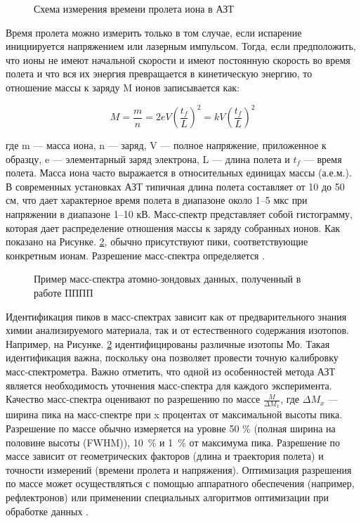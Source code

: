 \begin{figure}[ht]
	\caption{Схема измерения времени пролета иона в АЗТ}
	\label{fig:time_flight}
\end{figure} 

Время пролета можно измерить только в том случае, если испарение инициируется напряжением или лазерным импульсом. Тогда, если предположить, что ионы не имеют начальной скорости и имеют постоянную скорость во время полета и что вся их энергия превращается в кинетическую энергию, то отношение массы к заряду M ионов записывается как:

\begin{equation}
	\label{eq:equation8}
	M = \frac{m}{n} = 2eV(\frac{t_f}{L})^2 = kV(\frac{t_f}{L})^2
\end{equation}

где m — масса иона, n — заряд, V — полное напряжение, приложенное к образцу, e — элементарный заряд электрона, L — длина полета и $t_f$ — время полета. Масса иона часто выражается в относительных единицах массы (а.е.м.). В современных установках АЗТ типичная длина полета составляет от 10 до 50 см, что дает характерное время полета в диапазоне около 1–5 мкс при напряжении в диапазоне 1–10 кВ.
Масс-спектр представляет собой гистограмму, которая дает распределение отношения массы к заряду собранных ионов. Как показано на Рисунке. \cref{fig:mass_spectr}, обычно присутствуют пики, соответствующие конкретным ионам. Разрешение масс-спектра определяется .

\begin{figure}[ht]
	\caption{Пример масс-спектра атомно-зондовых данных, полученный в работе ПППП}
	\label{fig:mass_spectr}
\end{figure} 

Идентификация пиков в масс-спектрах зависит как от предварительного знания химии анализируемого материала, так и от естественного содержания изотопов. Например, на Рисунке. \cref{fig:mass_spectr} идентифицированы различные изотопы Мо. Такая идентификация важна, поскольку она позволяет провести точную калибровку масс-спектрометра. Важно отметить, что одной из особенностей метода АЗТ является необходимость уточнения масс-спектра для каждого эксперимента. Качество масс-спектра оценивают по разрешению по массе $\frac{M}{\Delta M_x}$, где $\Delta M_x$ — ширина пика на масс-спектре при x процентах от максимальной высоты пика. Разрешение по массе обычно измеряется на уровне 50 $\%$ (полная ширина на половине высоты (FWHM)), 10 $\%$ и 1 $\%$ от максимума пика. Разрешение по массе зависит от геометрических факторов (длина и траектория полета) и точности измерений (времени пролета и напряжения). Оптимизация разрешения по массе может осуществляться с помощью аппаратного обеспечения (например, рефлектронов) или применении специальных алгоритмов оптимизации при обработке данных \cite{Shutov19}.

